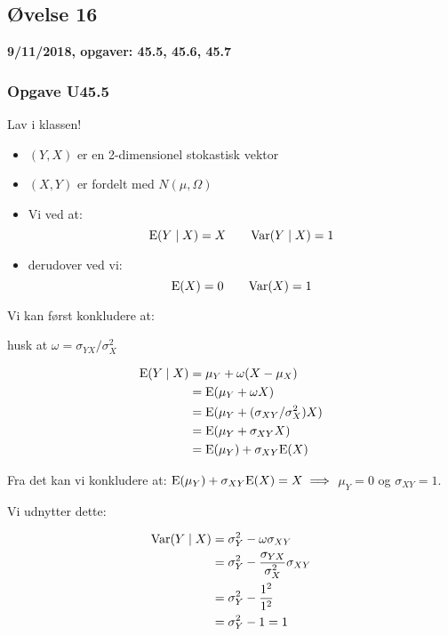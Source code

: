 \horizline

\subsection{Øvelse 16}

\textbf{9/11/2018, opgaver: 45.5, 45.6, 45.7}

\subsubsection{Opgave U45.5}

Lav i klassen!

\begin{itemize}
    \item $(Y, X)$ er en 2-dimensionel stokastisk vektor
    \item $(X,Y)$ er fordelt med $N(\mu, \Omega)$
    \item Vi ved at:
    \begin{equation}
        \text{E}(Y \mid X) = X\qquad \text{Var}(Y \mid X) = 1
    \end{equation}
    \item derudover ved vi:
    \begin{equation}
        \text{E}(X) = 0\qquad \text{Var}(X) = 1
    \end{equation}
\end{itemize}

Vi kan først konkludere at:

husk at $\omega = \sigma_{YX}/\sigma_{X}^2$

\begin{align}
    \text{E}(Y\mid X) &= \mu_Y + \omega(X - \mu_X) \\
    &= \text{E}(\mu_Y + \omega X) \\
    &= \text{E}(\mu_Y + (\sigma_{XY}/ \sigma^2_{X}) X) \\
    &= \text{E}(\mu_Y + \sigma_{XY} X) \\
    &= \text{E}(\mu_Y) + \sigma_{XY}\text{E}(X)
\end{align}

Fra det kan vi konkludere at: $\text{E}(\mu_Y) + \sigma_{XY}\text{E}(X) = X \implies$ $\mu_Y = 0$ og $\sigma_{XY} = 1$.

Vi udnytter dette:

\begin{align}
    \text{Var}(Y \mid X) &= \sigma_Y^2 - \omega \sigma_{XY} \\
    &= \sigma_Y^2 - \frac{\sigma_{YX}}{\sigma_X^2}\sigma_{XY} \\
    &= \sigma_Y^2 - \frac{1^2}{1^2} \\
    &= \sigma_Y^2 - 1 = 1
\end{align}

